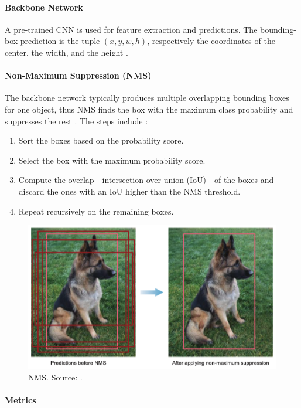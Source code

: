 \documentclass[a4paper, 11pt, oneside]{article}
\begin{document}
\paragraph{Backbone Network}

A pre-trained CNN is used for feature extraction and predictions. The bounding-box prediction is the tuple
$(x, y, w, h)$, respectively the coordinates of the center, the width, and the height
\cite{elgendy2020deep, geron2019hands}.

\paragraph{Non-Maximum Suppression (NMS)}

The backbone network typically produces multiple overlapping bounding boxes for one object, thus NMS finds
the box with the maximum class probability and suppresses the rest \cite{elgendy2020deep}. The steps include
\cite{bodla2017soft}:

\begin{enumerate}
  \item Sort the boxes based on the probability score.
  \item Select the box with the maximum probability score.
  \item Compute the overlap - intersection over union (IoU) - of the boxes and discard the ones with an IoU higher than
  the NMS threshold.
  \item Repeat recursively on the remaining boxes.
\end{enumerate}

\begin{figure}[ht]
  \begin{center}
    \includegraphics[width=.6\textwidth]{nms.png}
  \end{center}
  \caption{NMS. Source: \cite{elgendy2020deep}.}
\end{figure}

\paragraph{Metrics}
\end{document}

